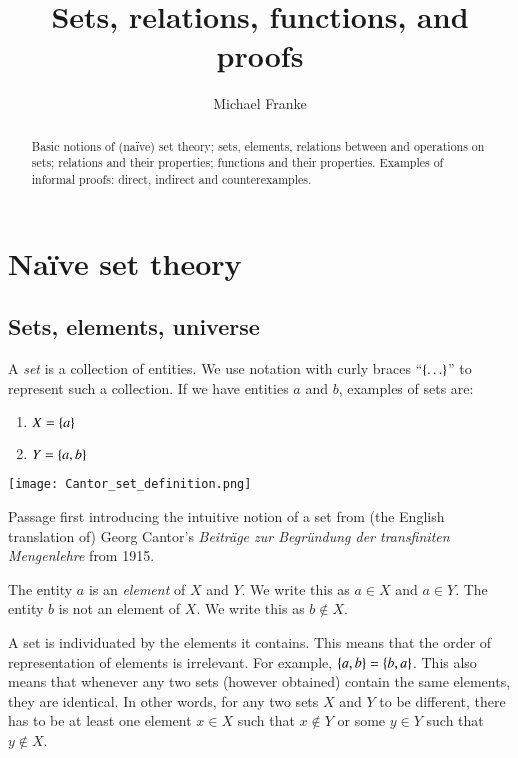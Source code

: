 \documentclass[nobib,nofonts]{tufte-handout}
\title{Sets, relations, functions, and proofs}
\author[M.~Franke]{Michael Franke}
\date{} %
\begin{document}
\maketitle

\begin{abstract}
\noindent
Basic notions of (na\"{i}ve) set theory; sets, elements, relations between and operations on
sets; relations and their properties; functions and their properties. Examples of informal
proofs: direct, indirect and counterexamples.
\end{abstract}

\section{Na\"{i}ve set theory}

\subsection{Sets, elements, universe}
\label{sec:sets}

A \emph{set} is a collection of entities. We use notation with curly braces ``$\left\{\ldots\right\}$''
to represent such a collection. If we have entities $a$ and $b$, examples of sets are:

\begin{multicols}{2}
  \begin{enumerate}[]
  \item $X = \left\{a\right\}$
  \item $Y = \left\{a, b\right\}$
  \end{enumerate}
\end{multicols}

\begin{marginfigure}
  \texttt{[image: Cantor\_set\_definition.png]}
  \caption{Passage first introducing the intuitive notion of a set from (the English
    translation of) Georg Cantor's \emph{Beiträge zur Begründung der transfiniten Mengenlehre}
    from 1915.}
\end{marginfigure}

\noindent The entity $a$ is an \emph{element} of $X$ and $Y$. We write this as $a \in X$ and $a \in
Y$. The entity $b$ is not an element of $X$. We write this as $b \not \in X$.

A set is individuated by the elements it contains. This means that the order of representation
of elements is irrelevant. For example, $\left\{a,b\right\} = \left\{b,a\right\}$. This also means that whenever
any two sets (however obtained) contain the same elements, they are identical. In other words,
for any two sets $X$ and $Y$ to be different, there has to be at least one element $x \in X$
such that $x \not \in Y$ or some $y \in Y$ such that $y \not \in X$.
\end{document}
